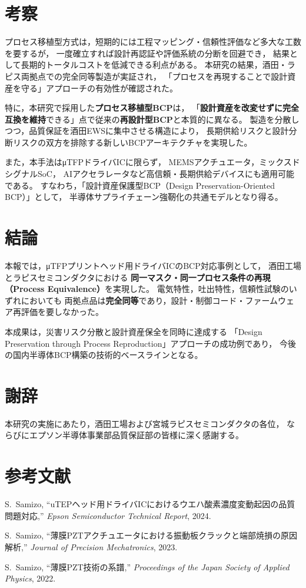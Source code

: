 \documentclass[conference]{IEEEtran}
\begin{document}
\section{考察}
プロセス移植型方式は，短期的には工程マッピング・信頼性評価など多大な工数を要するが，
一度確立すれば設計再認証や評価系統の分断を回避でき，
結果として長期的トータルコストを低減できる利点がある。
本研究の結果，酒田・ラピス両拠点での完全同等製造が実証され，
「プロセスを再現することで設計資産を守る」アプローチの有効性が確認された。

特に，本研究で採用した\textbf{プロセス移植型BCP}は，
「\textbf{設計資産を改変せずに完全互換を維持}できる」点で従来の\textbf{再設計型BCP}と本質的に異なる。
製造を分散しつつ，品質保証を酒田EWSに集中させる構造により，
長期供給リスクと設計分断リスクの双方を排除する新しいBCPアーキテクチャを実現した。

また，本手法はμTFPドライバICに限らず，
MEMSアクチュエータ，ミックスドシグナルSoC，
AIアクセラレータなど高信頼・長期供給デバイスにも適用可能である。
すなわち，「設計資産保護型BCP（Design Preservation-Oriented BCP）」として，
半導体サプライチェーン強靭化の共通モデルとなり得る。

\section{結論}
本報では，μTFPプリントヘッド用ドライバICのBCP対応事例として，
酒田工場とラピスセミコンダクタにおける
\textbf{同一マスク・同一プロセス条件の再現（Process Equivalence）}を実現した。
電気特性，吐出特性，信頼性試験のいずれにおいても
両拠点品は\textbf{完全同等}であり，設計・制御コード・ファームウェア再評価を要しなかった。

本成果は，災害リスク分散と設計資産保全を同時に達成する
「Design Preservation through Process Reproduction」アプローチの成功例であり，
今後の国内半導体BCP構築の技術的ベースラインとなる。

\section*{謝辞}
本研究の実施にあたり，酒田工場および宮城ラピスセミコンダクタの各位，
ならびにエプソン半導体事業部品質保証部の皆様に深く感謝する。

\section*{参考文献}
\begin{thebibliography}{99}
S.~Samizo, 
``uTEPヘッド用ドライバICにおけるウエハ酸素濃度変動起因の品質問題対応,'' 
\textit{Epson Semiconductor Technical Report}, 2024.

S.~Samizo, 
``薄膜PZTアクチュエータにおける振動板クラックと端部焼損の原因解析,'' 
\textit{Journal of Precision Mechatronics}, 2023.

S.~Samizo, 
``薄膜PZT技術の系譜,'' 
\textit{Proceedings of the Japan Society of Applied Physics}, 2022.
\end{thebibliography}
\end{document}

